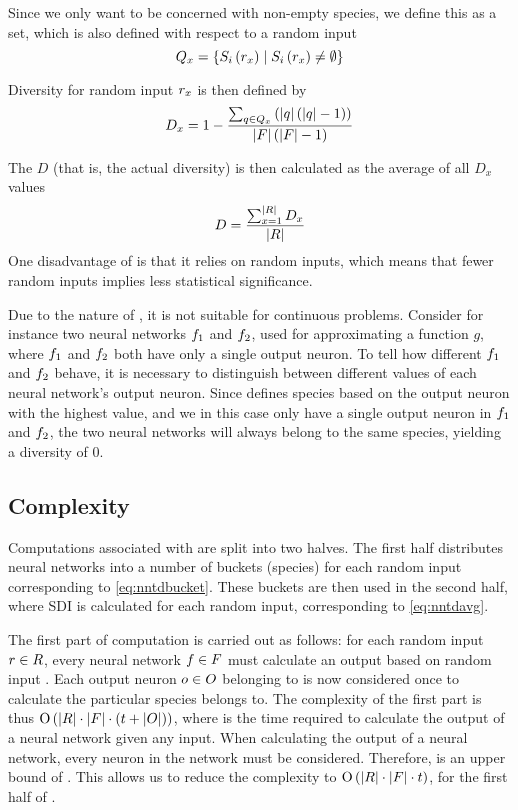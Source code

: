 Since we only want to be concerned with non-empty species, we define this as a set, which is also defined with respect to a random input
\begin{equation*}\label{eq:nonemptyspecies}
  Q_{x} = \left\{ S_{i}\left(r_x\right) \mid S_{i}\left(r_x\right) \neq \emptyset \right\}
\end{equation*}

Diversity for random input $r_x$ is then defined by
%
\begin{equation*}\label{eq:nntd}
  D_x = 1 - \frac{\sum_{q \in Q_{x}}\left(\lvert q\rvert\left(\lvert q\rvert - 1\right)\right)}{\lvert F\rvert\left(\lvert F\rvert - 1\right)}
\end{equation*}
%

The \dia{} $D$ (that is, the actual diversity) is then calculated as the average of all $D_x$ values
%
\begin{equation}\label{eq:nntdavg}
  D =\frac{\sum_{x=1}^{\lvert R\rvert}{D_x}}{\lvert R\rvert}
\end{equation}
%
One disadvantage of \dia{} is that it relies on random inputs, which means that fewer random inputs implies less statistical significance. 

Due to the nature of \dia, it is not suitable for continuous problems. Consider for instance two neural networks $f_1$ and $f_2$, used for approximating a function $g$, where $f_1$ and $f_2$ both have only a single output neuron. To tell how different $f_1$ and $f_2$ behave, it is necessary to distinguish between different values of each neural network's output neuron. Since \dia{} defines species based on the output neuron with the highest value, and we in this case only have a single output neuron in $f_1$ and $f_2$, the two neural networks will always belong to the same species, yielding a diversity of 0.  

\subsection{Complexity}
Computations associated with \dia{} are split into two halves. The first half distributes neural networks into a number of buckets (species) for each random input corresponding to \cref{eq:nntdbucket}. These buckets are then used in the second half, where SDI is calculated for each random input, corresponding to \cref{eq:nntdavg}.

The first part of computation is carried out as follows: for each random input $r \in R$, every neural network $f \in F$ must calculate an output based on random input \ran. Each output neuron $o \in O$ belonging to \ind{} is now considered once to calculate the particular species \ind{} belongs to. The complexity of the first part is thus $\operatorname{O}\left(\lvert R\rvert \cdot \lvert F\rvert \cdot \left(t + \lvert O\rvert\right)\right)$, where \timet{} is the time required to calculate the output of a neural network given any input. When calculating the output of a neural network, every neuron in the network must be considered. Therefore, \timet{} is an upper bound of \nnoutsetl. This allows us to reduce the complexity to $\operatorname{O}\left(\lvert R\rvert \cdot \lvert F\rvert \cdot t\right)$, for the first half of \dia.

